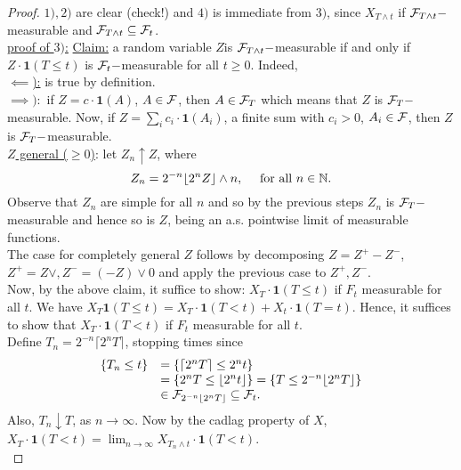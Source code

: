 \documentclass{article}
\begin{document}
\begin{proof}
    $ 1), 2)$ are clear (check!) and $ 4)$ is immediate from $ 3)$, since $ X_{T\land t}$ if $ \mathcal{F}_{T\land t}-$measurable and $\mathcal{F}_{T\land t} \subseteq \mathcal{F}_{t}$.\\ 

\underline{proof of $ 3)$:} \underline{Claim:} a random variable $ Z$is $ \mathcal{F}_{T\land t}-$measurable if and only if $ Z\cdot \mathbf{1}(T\leq t)$ is $ \mathcal{F}_{t}-$measurable for all $ t\geq 0$. Indeed, \\ 

\underline{$ \impliedby$):} is true by definition. \\ 

\underline{$ \implies):$} if $ Z = c\cdot \mathbf{1}(A)$, $ A\in \mathcal{F}$, then $ A\in \mathcal{F}_{T}$ which means that $ Z$ is $ \mathcal{F}_{T}-$measurable. Now, if $ Z =\displaystyle\sum_{i}c_{i}\cdot \mathbf{1}(A_{i}) $, a finite sum with $ c_{i}>0$, $ A_{i}\in \mathcal{F}$, then $ Z$ is $ \mathcal{F}_{T}-$measurable.\\ 

\underline{$ Z$ general ($ \geq 0$)}: let $ Z_{n}\uparrow Z$, where 
\[
	Z_{n} = 2^{-n}\lfloor 2^n Z\rfloor \land n, \quad \text{ for all } n \in \mathbb{N}.
\]
Observe that $ Z_{n}$ are simple for all $ n$ and so by the previous steps $ Z_{n}$ is $ \mathcal{F}_{T}-$measurable and hence so is $ Z$, being an a.s. pointwise limit of measurable functions.\\ 

The case for completely general $ Z$ follows by decomposing $ Z = Z^{+}-Z^{-}$, $ Z^{+} = Z \lor, Z^{-} = (-Z)\lor 0$ and apply the previous case to $ Z^{+}, Z^{-}$.\\ 

Now, by the above claim, it suffice to show: $ X_{T}\cdot \mathbf{1}(T\leq t)$ if $ F_{t}$ measurable for all $ t$. We have $ X_{T} \mathbf{1}(T\leq t) = X_{T}\cdot \mathbf{1}(T<t)+X_{t}\cdot \mathbf{1}(T=t)$. Hence, it suffices to show  that  $ X_{T}\cdot \mathbf{1}(T< t)$ if $ F_{t}$ measurable for all $ t$.\\ 

Define $ T_{n} = 2^{-n}\lceil 2^n T \rceil $, stopping times since 
\[
\begin{array}{ll}
	\{T_{n}\leq t\} &= \{\lceil 2^n T\rceil \leq 2^n t\} \\
			&= \{2^n T\leq \lfloor 2^n t\rfloor\} = \{T\leq 2^{-n}\lfloor 2^n T\rfloor\}\\ 
			&\in \mathcal{F}_{2^{-n}\lfloor 2^n T\rfloor}\subseteq \mathcal{F}_{t}.
\end{array}
\]
Also, $ T_{n}\downarrow T$, as $ n\to \infty$. Now by the cadlag property of $ X$,\\ 
$ X_{T}\cdot \mathbf{1}(T<t) = \lim_{n \to \infty} X_{T_{n}\land t}\cdot \mathbf{1}(T<t)$.\\ 


\end{proof}
\end{document}

